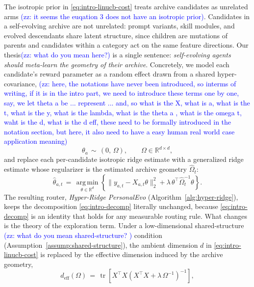 \documentclass{article} %
\providecommand{\argmin}{\mathop{\mathrm{arg\,min}}\limits}
\providecommand{\zz}[1]{\textcolor{blue}{(zz: #1)}}
\begin{document}
The isotropic prior in \eqref{eq:intro-linucb-cost} treats archive candidates as unrelated arms \zz{it seems the euqation 3 does not have an isotropic prior}. Candidates in a self-evolving archive are not unrelated: prompt variants, skill modules, and evolved descendants share latent structure, since children are mutations of parents and candidates within a category act on the same feature directions. Our thesis\zz{what do you mean here?} is a single sentence: \emph{self-evolving agents should meta-learn the geometry of their archive}. Concretely, we model each candidate's reward parameter as a random effect drawn from a shared hyper-covariance, \zz{here, the notations have never been introduced, so interms of writing, if it is in the intro part, we need to introduce these terms one by one, say, we let theta a be ... represent ... and, so what is the X, what is a, what is the t, what is the y, what is the lambda, what is the theta a , what is the omega t, waht is the d, what is the d eff, these need to be formally introduced in the notation section, but here, it also need to have a easy human real world case application meaning}
\begin{equation}
\label{eq:intro-random-effect}
\theta_a \,\sim\, (0,\, \Omega),
\qquad
\Omega \in \mathbb{R}^{d\times d},
\end{equation}
and replace each per-candidate isotropic ridge estimate with a generalized ridge estimate whose regularizer is the estimated archive geometry $\widehat\Omega_t$:
\begin{equation}
\label{eq:intro-hyper-ridge}
\widehat\theta_{a,t}
\,=\,
\argmin_{\theta \in \mathbb{R}^d}
\left\{
\|y_{a,t} - X_{a,t}\theta\|_2^2
+
\lambda\, \theta^\top \widehat\Omega_t^{-1}\theta
\right\}.
\end{equation}
The resulting router, \emph{Hyper-Ridge PersonalEvo} (Algorithm~\ref{alg:hyper-ridge}), keeps the decomposition \eqref{eq:intro-decomp} literally unchanged, because \eqref{eq:intro-decomp} is an identity that holds for any measurable routing rule. What changes is the theory of the exploration term. Under a low-dimensional shared-structure \zz{what do you mean shared-structure? } condition (Assumption~\ref{assump:shared-structure}), the ambient dimension $d$ in \eqref{eq:intro-linucb-cost} is replaced by the effective dimension induced by the archive geometry,
\begin{equation}
\label{eq:intro-deff}
d_{\mathrm{eff}}(\Omega)
\,=\,
\operatorname{tr}\!\left[
X^\top X
\left(X^\top X + \lambda\,\Omega^{-1}\right)^{-1}
\right],
\end{equation}
\end{document}
